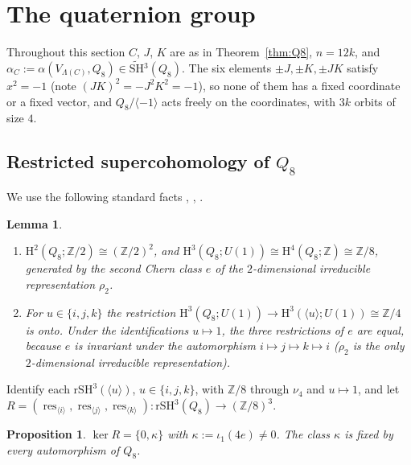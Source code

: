 \documentclass[11pt]{amsart}
\newtheorem{lemma}[theorem]{Lemma}
\newtheorem{proposition}[theorem]{Proposition}
\theoremstyle{definition}
\newcommand{\Z}{\mathbb{Z}}
\newcommand{\res}{\operatorname{res}}
\newcommand{\SH}{\widetilde{\mathrm{SH}}{}^3}
\newcommand{\rSH}{\mathrm{rSH}^3}
\newcommand{\Hc}{\mathrm{H}}
\begin{document}
\section{The quaternion group}\label{sec:Q8}

Throughout this section $C$, $J$, $K$ are as in Theorem~\ref{thm:Q8}, $n=12k$, and
$\alpha_C:=\alpha(V_{\Lambda(C)},Q_8)\in\SH(Q_8)$. The six elements $\pm J,\pm K,\pm JK$ satisfy $x^2=-1$
(note $(JK)^2=-J^2K^2=-1$), so none of them has a fixed coordinate or a fixed vector, and
$Q_8/\langle-1\rangle$ acts freely on the coordinates, with $3k$ orbits of size $4$.

\subsection{Restricted supercohomology of \texorpdfstring{$Q_8$}{Q8}}
We use the following standard facts \cite[XII.7]{CE}, \cite[IV]{AM}, \cite[VI.9]{Brown}.

\begin{lemma}\label{lem:cohQ8}
\begin{enumerate}
\item $\Hc^2(Q_8;\Z/2)\cong(\Z/2)^2$, and $\Hc^3(Q_8;U(1))\cong\Hc^4(Q_8;\Z)\cong\Z/8$, generated by
  the second Chern class $e$ of the $2$-dimensional irreducible representation $\rho_2$.
\item For $u\in\{i,j,k\}$ the restriction $\Hc^3(Q_8;U(1))\to\Hc^3(\langle u\rangle;U(1))\cong\Z/4$ is
  onto. Under the identifications $u\mapsto1$, the three restrictions of $e$ are equal, because $e$ is
  invariant under the automorphism $i\mapsto j\mapsto k\mapsto i$ ($\rho_2$ is the only $2$-dimensional
  irreducible representation).
\end{enumerate}
\end{lemma}

Identify each $\rSH(\langle u\rangle)$, $u\in\{i,j,k\}$, with $\Z/8$ through $\nu_4$ and $u\mapsto1$, and
let $R=(\res_{\langle i\rangle},\res_{\langle j\rangle},\res_{\langle k\rangle})\colon\rSH(Q_8)\to
(\Z/8)^3$.

\begin{proposition}\label{prop:kernel}
$\ker R=\{0,\kappa\}$ with $\kappa:=\iota_1(4e)\ne0$. The class $\kappa$ is fixed by every automorphism of
$Q_8$.
\end{proposition}
\end{document}
